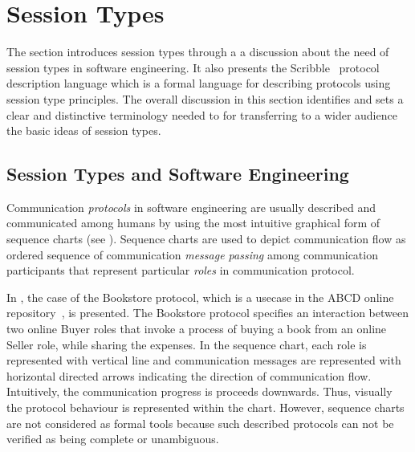 \section{Session Types}
\label{sec:session_types}


The section introduces session types through a
a discussion about the need of session types in
software engineering.
It also presents the Scribble~\cite{scribble} protocol
description language which is a formal language for describing
protocols using session type principles.
The overall discussion in this section identifies and sets
a clear and distinctive terminology needed to
for transferring to a wider audience the basic ideas of session
types.

\subsection{Session Types and Software Engineering}%
\label{sec:sessions_software}



Communication \emph{protocols} in software engineering
are usually described and communicated among humans
by using the most intuitive graphical form of sequence charts
(see ).
Sequence charts are used to depict communication flow as ordered
sequence of communication \emph{message passing} among communication
participants that represent particular \emph{roles} in communication
protocol.

In , the case of the Bookstore protocol, which is a usecase
in the ABCD online repository~\cite{usecase_repository},  is presented.
The Bookstore protocol specifies an interaction between two online Buyer roles
that invoke a process of buying a book from an online Seller role, while
sharing the expenses.
In the sequence chart, each role is represented with vertical line and
communication messages are represented with horizontal directed arrows
indicating the direction of communication flow.
Intuitively, the communication progress is proceeds downwards.
Thus, visually the protocol behaviour is represented within the chart.
However, sequence charts are not considered as formal tools because
such described protocols can not be verified as being complete or unambiguous.

